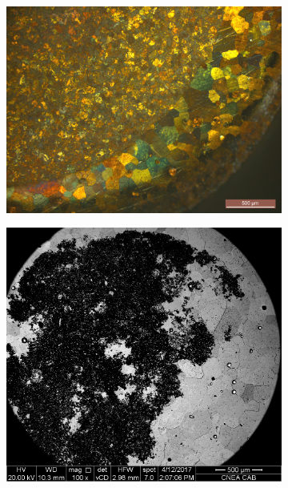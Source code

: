 \documentclass[a4paper,12pt,fleqn,twoside,openany]{book}
\begin{document}
  \begin{figure}%
    \centering
    
    ~ %
    \begin{subfigure}{0.35\textwidth}
        \includegraphics[width=\textwidth]{Img/Resultados/clavos/Clavo1.jpg}
        \caption{}%
        \label{fig: MicroClavo1}
    \end{subfigure}
        \begin{subfigure}{0.3\textwidth}
        \includegraphics[width=\textwidth]{Img/Resultados/clavos/Clavo1Retro.jpg}

\end{subfigure}
\end{figure}
\end{document}
